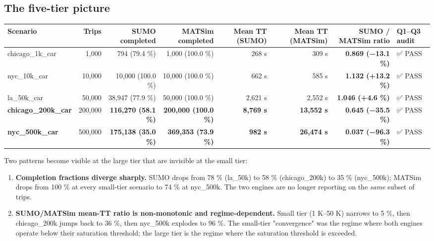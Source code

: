 \subsection{The five-tier picture}\label{the-five-tier-picture}

\begin{longtable}[]{@{}lrrrrrrl@{}}
\toprule\noalign{}
Scenario & Trips & SUMO completed & MATSim completed & Mean TT (SUMO) &
Mean TT (MATSim) & SUMO / MATSim ratio & Q1--Q3 audit \\
\midrule\noalign{}
\endhead
\bottomrule\noalign{}
\endlastfoot
chicago\_1k\_car & 1,000 & 794 (79.4 \%) & 1,000 (100.0 \%) & 268 s &
309 s & \textbf{0.869 (−13.1 \%)} & ✅ PASS \\
nyc\_10k\_car & 10,000 & 10,000 (100.0 \%) & 10,000 (100.0 \%) & 662 s &
585 s & \textbf{1.132 (+13.2 \%)} & ✅ PASS \\
la\_50k\_car & 50,000 & 38,947 (77.9 \%) & 50,000 (100.0 \%) & 2,621 s &
2,552 s & \textbf{1.046 (+4.6 \%)} & ✅ PASS \\
\textbf{chicago\_200k\_car} & 200,000 & \textbf{116,270 (58.1 \%)} &
\textbf{200,000 (100.0 \%)} & \textbf{8,769 s} & \textbf{13,552 s} &
\textbf{0.645 (−35.5 \%)} & ✅ PASS \\
\textbf{nyc\_500k\_car} & 500,000 & \textbf{175,138 (35.0 \%)} &
\textbf{369,353 (73.9 \%)} & \textbf{982 s} & \textbf{26,474 s} &
\textbf{0.037 (−96.3 \%)} & ✅ PASS \\
\end{longtable}

Two patterns become visible at the large tier that are invisible at the
small tier:

\begin{enumerate}
\def\labelenumi{\arabic{enumi}.}
\tightlist
\item
  \textbf{Completion fractions diverge sharply.} SUMO drops from 78 \%
  (la\_50k) to 58 \% (chicago\_200k) to 35 \% (nyc\_500k); MATSim drops
  from 100 \% at every small-tier scenario to 74 \% at nyc\_500k. The
  two engines are no longer reporting on the \emph{same} subset of
  trips.
\item
  \textbf{SUMO/MATSim mean-TT ratio is non-monotonic and
  regime-dependent.} Small tier (1 K--50 K) narrows to 5 \%, then
  chicago\_200k jumps back to 36 \%, then nyc\_500k explodes to 96 \%.
  The small-tier "convergence" was the regime where both engines operate
  below their saturation threshold; the large tier is the regime where
  the saturation threshold is exceeded.
\end{enumerate}

